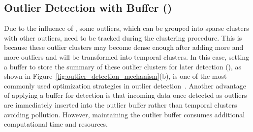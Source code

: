 \subsection{Outlier Detection with Buffer (\buffer)}
\label{subsec:buffer}
Due to the influence of \oef, some outliers, which can be grouped into sparse clusters with other outliers, need to be tracked during the clustering procedure. This is because these outlier clusters may become dense enough after adding more and more outliers and will be transformed into 
temporal clusters. In this case, setting a buffer to store the summary of these outlier clusters for later detection (\buffer), as shown in Figure~\ref{fig:outlier_detection_mechanism}(b), is one of the most commonly used optimization strategies in outlier detection~\cite{DenStream:06,EDMStream:17}. 
Another advantage of applying a buffer for detection is that incoming data once detected as outliers are immediately inserted into the outlier buffer rather than temporal clusters avoiding pollution. However, maintaining the outlier buffer consumes additional computational time and resources. 





